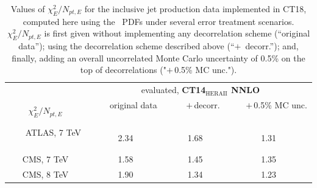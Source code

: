 %
\begin{table}[tb]
	\begin{tabular}{c|ccc}
		\hline
		\hline
       	&	\multicolumn{3}{c}{evaluated, {\bf CT14$_\mathrm{HERAII}$ NNLO}} 	\ \ \ \\
		\ \ \  $\chi^2_E/N_{pt,E}$ \ \ \	& \ \ \ original data \ \ \  &  \ \ \  $+$\,decorr. \ \ \    &  \ \ \  $+$\,0.5\% MC unc. \ \ \   \\
		\hline
		\ \ \ ATLAS, 7 TeV \ \ \   &  \ \ \  2.34 \ \ \   &  \ \ \  1.68 \ \ \   &  \ \ \  1.31 \ \ \   \\
		\ \ \ CMS, 7 TeV   \ \ \   &  \ \ \  1.58 \ \ \   &  \ \ \  1.45 \ \ \   &  \ \ \  1.35 \ \ \   \\
		\ \ \ CMS, 8 TeV   \ \ \   &  \ \ \  1.90 \ \ \   &  \ \ \  1.34 \ \ \   &  \ \ \  1.23 \ \ \   \\
		\hline
		\hline
	\end{tabular}
	\caption{Values of $\chi^2_E/N_{pt,E}$ for the inclusive jet production data implemented in CT18,
		computed here using the \CTHERAII~PDFs \cite{Hou:2016nqm} under several error treatment scenarios. $\chi^2_E/N_{pt,E}$ is first given without
		implementing any decorrelation scheme (``original data''); using the decorrelation scheme described
		above (``$+$\, decorr.''); and, finally, adding an overall uncorrelated Monte Carlo uncertainty of 0.5\% on the top of decorrelations ("$+$\,0.5\% MC unc.").
	}
	\label{tab-chi}
\end{table}

